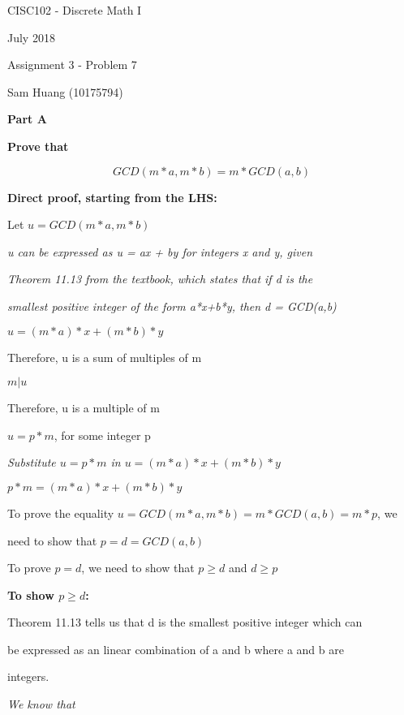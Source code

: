 \documentclass{report}
\begin{document}
    CISC102 - Discrete Math I
    
    July 2018
    
    \bigskip
        
    Assignment 3 - Problem 7
    
    Sam Huang (10175794)
    \bigskip
    
    \centerline{\textbf{Part A}}
    
    \centerline{\textbf{Prove that}} 
    
    $$GCD(m*a,m*b)=m*GCD(a,b)$$
    
    \bigskip
    
    \textbf{Direct proof, starting from the LHS:}
    
    Let  $u = GCD(m*a, m*b)$
    
    \textit{u can be expressed as u = ax + by  for integers x and y, given}
    
    \textit{Theorem 11.13 from the textbook, which states that if d is the} 
    
    \textit{smallest positive integer of the form a*x+b*y, then d = GCD(a,b)}
    
    $u = (m*a)*x + (m*b)*y$
    
    Therefore, u is a sum of multiples of m
    
    $ m | u$
    
    Therefore, u is a multiple of m
    
    $ u = p*m$, for some integer p
    
    \textit{Substitute $u = p*m$ in $u = (m*a)*x + (m*b)*y$}
    
    $p*m = (m*a)*x + (m*b)*y$
    
    \bigskip
    
    
    To prove the equality $u = GCD(m*a, m*b) = m*GCD(a,b) = m*p$, we 
    
    need to show that $p = d = GCD(a,b)$
    
    To prove $p = d$, we need to show that $p \geq d$ and $d \geq p$
    
    \medskip
    
    \textbf{To show $p \geq d$:}
    
    Theorem 11.13 tells us that d is the smallest positive integer which can
    
    be expressed as an linear combination of a and b where a and b are
    
    integers. 
    
    \textit{We know that}
    
\end{document}
